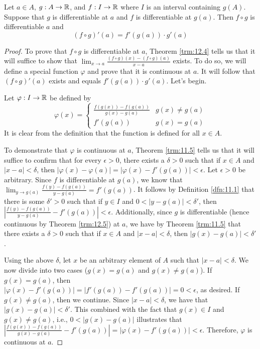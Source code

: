 \documentclass[../main.tex]{subfiles}
\begin{document}
\begin{theorem}\label{trm:12.10}
    Let $a\in A$, $g:A\to\mathbb{R}$, and $f:I\to\mathbb{R}$ where $I$ is an interval containing $g(A)$. Suppose that $g$ is differentiable at $a$ and $f$ is differentiable at $g(a)$. Then $f\circ g$ is differentiable $a$ and
    \begin{equation*}
        (f\circ g)'(a) = f'(g(a))\cdot g'(a)
    \end{equation*}
    \begin{proof}
        To prove that $f\circ g$ is differentiable at $a$, Theorem \ref{trm:12.4} tells us that it will suffice to show that $\lim_{x\to a}\frac{(f\circ g)(x)-(f\circ g)(a)}{x-a}$ exists. To do so, we will define a special function $\varphi$ and prove that it is continuous at $a$. It will follow that $(f\circ g)'(a)$ exists and equals $f'(g(a))\cdot g'(a)$. Let's begin.\par
        Let $\varphi:I\to\mathbb{R}$ be defined by
        \begin{equation*}
            \varphi(x) =
            \begin{cases}
                \frac{f(g(x))-f(g(a))}{g(x)-g(a)} & g(x)\neq g(a)\\
                f'(g(a)) & g(x)=g(a)
            \end{cases}
        \end{equation*}
        It is clear from the definition that the function is defined for all $x\in A$.\par
        To demonstrate that $\varphi$ is continuous at $a$, Theorem \ref{trm:11.5} tells us that it will suffice to confirm that for every $\epsilon>0$, there exists a $\delta>0$ such that if $x\in A$ and $|x-a|<\delta$, then $|\varphi(x)-\varphi(a)|=|\varphi(x)-f'(g(a))|<\epsilon$. Let $\epsilon>0$ be arbitrary. Since $f$ is differentiable at $g(a)$, we know that $\lim_{y\to g(a)}\frac{f(y)-f(g(a))}{y-g(a)}=f'(g(a))$. It follows by Definition \ref{dfn:11.1} that there is some $\delta'>0$ such that if $y\in I$ and $0<|y-g(a)|<\delta'$, then $|\frac{f(y)-f(g(a))}{y-g(a)}-f'(g(a))|<\epsilon$. Additionally, since $g$ is differentiable (hence continuous by Theorem \ref{trm:12.5}) at $a$, we have by Theorem \ref{trm:11.5} that there exists a $\delta>0$ such that if $x\in A$ and $|x-a|<\delta$, then $|g(x)-g(a)|<\delta'$.\par
        Using the above $\delta$, let $x$ be an arbitrary element of $A$ such that $|x-a|<\delta$. We now divide into two cases ($g(x)=g(a)$ and $g(x)\neq g(a)$). If $g(x)=g(a)$, then $|\varphi(x)-f'(g(a))|=|f'(g(a))-f'(g(a))|=0<\epsilon$, as desired. If $g(x)\neq g(a)$, then we continue. Since $|x-a|<\delta$, we have that $|g(x)-g(a)|<\delta'$. This combined with the fact that $g(x)\in I$ and $g(x)\neq g(a)$, i.e., $0<|g(x)-g(a)|$ illustrates that $|\frac{f(g(x))-f(g(a))}{g(x)-g(a)}-f'(g(a))|=|\varphi(x)-f'(g(a))|<\epsilon$. Therefore, $\varphi$ is continuous at $a$.\par

\end{proof}
\end{theorem}
\end{document}
